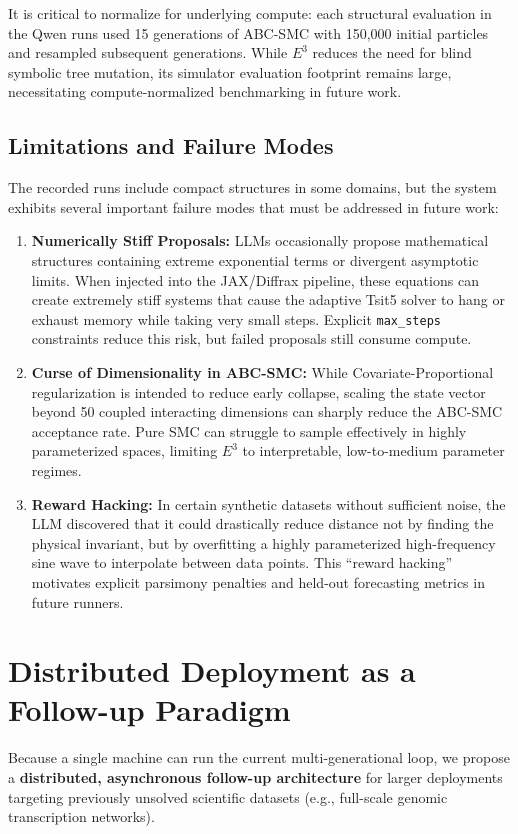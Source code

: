 It is critical to normalize for underlying compute: each structural evaluation in the Qwen runs used 15 generations of ABC-SMC with 150,000 initial particles and resampled subsequent generations. While $E^3$ reduces the need for blind symbolic tree mutation, its simulator evaluation footprint remains large, necessitating compute-normalized benchmarking in future work.

\subsection{Limitations and Failure Modes}
The recorded runs include compact structures in some domains, but the system exhibits several important failure modes that must be addressed in future work:
\begin{enumerate}
    \item \textbf{Numerically Stiff Proposals:} LLMs occasionally propose mathematical structures containing extreme exponential terms or divergent asymptotic limits. When injected into the JAX/Diffrax pipeline, these equations can create extremely stiff systems that cause the adaptive Tsit5 solver to hang or exhaust memory while taking very small steps. Explicit \texttt{max\_steps} constraints reduce this risk, but failed proposals still consume compute.
    \item \textbf{Curse of Dimensionality in ABC-SMC:} While Covariate-Proportional regularization is intended to reduce early collapse, scaling the state vector beyond 50 coupled interacting dimensions can sharply reduce the ABC-SMC acceptance rate. Pure SMC can struggle to sample effectively in highly parameterized spaces, limiting $E^3$ to interpretable, low-to-medium parameter regimes.
    \item \textbf{Reward Hacking:} In certain synthetic datasets without sufficient noise, the LLM discovered that it could drastically reduce distance not by finding the physical invariant, but by overfitting a highly parameterized high-frequency sine wave to interpolate between data points. This ``reward hacking'' motivates explicit parsimony penalties and held-out forecasting metrics in future runners.
\end{enumerate}

\section{Distributed Deployment as a Follow-up Paradigm}
\label{sec:future}

Because a single machine can run the current multi-generational loop, we propose a \textbf{distributed, asynchronous follow-up architecture} for larger deployments targeting previously unsolved scientific datasets (e.g., full-scale genomic transcription networks).

